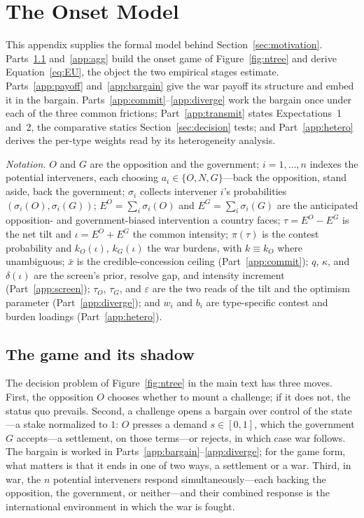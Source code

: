 
\section{The Onset Model}
\label{app:model}

This appendix supplies the formal model behind Section~\ref{sec:motivation}.
Parts~\ref{app:game} and~\ref{app:agg} build the onset game of
Figure~\ref{fig:ntree} and derive Equation~\eqref{eq:EU}, the object the two
empirical stages estimate.  Parts~\ref{app:payoff} and~\ref{app:bargain} give
the war payoff its structure and embed it in the bargain.
Parts~\ref{app:commit}--\ref{app:diverge} work the bargain once under each of
the three common frictions; Part~\ref{app:transmit} states Expectations~1
and~2, the comparative statics Section~\ref{sec:decision} tests; and
Part~\ref{app:hetero} derives the per-type weights read by its heterogeneity
analysis.

\emph{Notation.}  $O$ and $G$ are the opposition and the government; $i = 1,
\dots, n$ indexes the potential interveners, each choosing $a_i \in \{O, N,
G\}$---back the opposition, stand aside, back the government; $\sigma_i$
collects intervener $i$'s probabilities $(\sigma_i(O), \sigma_i(G))$; $E^O =
\sum_i \sigma_i(O)$ and $E^G = \sum_i \sigma_i(G)$ are the anticipated
opposition- and government-biased intervention a country faces; $\tau = E^O -
E^G$ is the net tilt and $\iota = E^O + E^G$ the common intensity;
$\pi(\tau)$ is the contest probability and $k_O(\iota)$, $k_G(\iota)$ the war
burdens, with $k \equiv k_O$ where unambiguous; $\bar{x}$ is the
credible-concession ceiling (Part~\ref{app:commit}); $q$, $\kappa$, and $\delta(\iota)$ are the
screen's prior, resolve gap, and intensity increment
(Part~\ref{app:screen}); $\tau_O$, $\tau_G$, and $\varepsilon$ are
the two reads of the tilt and the optimism parameter
(Part~\ref{app:diverge}); and $w_i$ and $b_i$ are type-specific contest and
burden loadings (Part~\ref{app:hetero}).

\subsection{The game and its shadow}
\label{app:game}

The decision problem of Figure~\ref{fig:ntree} in the main text has three
moves.  First, the opposition $O$ chooses whether to mount a challenge; if it
does not, the status quo prevails.  Second, a challenge opens a bargain over
control of the state---a stake normalized to $1$: $O$ presses a demand $s \in
[0,1]$, which the government $G$ accepts---a settlement, on those terms---or
rejects, in which case war follows.  The bargain is worked in
Parts~\ref{app:bargain}--\ref{app:diverge}; for the game form, what matters
is that it ends in one of two ways, a settlement or a war.  Third, in war,
the $n$ potential interveners respond simultaneously---each backing the
opposition, the government, or neither---and their combined response is the
international environment in which the war is fought.

